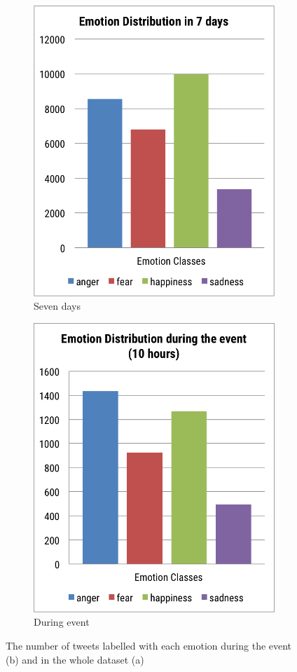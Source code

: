 \begin{figure}[htb!] 
\centering 
\begin{subfigure}{0.5\textwidth}
\centering
\includegraphics[width=0.8\linewidth]{EmotionDistributionWeek}
\caption{Seven days}
\label{fig:emotionDistributionWeek}
\end{subfigure}%
\begin{subfigure}{0.5\textwidth}
\centering
\includegraphics[width=0.8\linewidth]{EmotionDistributionEvent}
\caption{During event}
\label{fig:emotionDistributionEvent}
\end{subfigure}
\caption{The number of tweets labelled with each emotion during the event (b) and in the whole dataset (a)}
\end{figure}

